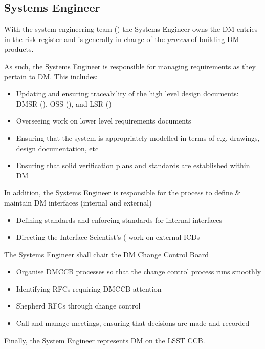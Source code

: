 \subsection{Systems Engineer \label{role:sysengineer}}

With the system engineering team () the Systems Engineer owns the DM entries in the risk register and is generally in charge of the \textit{process} of building DM products.

As such, the Systems Engineer is responsible for managing requirements as they pertain to DM.
This includes:

\begin{itemize}
\item Updating and ensuring traceability of the high level design documents: DMSR (), OSS (), and LSR ()
\item Overseeing work on lower level requirements documents
\item Ensuring that the system is appropriately modelled in terms of e.g. drawings, design documentation, etc
\item Ensuring that solid verification plans and standards are established within DM
\end{itemize}

In addition, the Systems Engineer is responsible for the process to define \& maintain DM interfaces (internal and external)

\begin{itemize}
\item Defining standards and enforcing standards for internal interfaces
\item Directing the Interface Scientist's ( work on external ICDs
\end{itemize}

The Systems Engineer shall chair the DM Change Control Board 

\begin{itemize}
\item Organise DMCCB processes so that the change control process runs smoothly
\item Identifying RFCs requiring DMCCB attention
\item Shepherd RFCs through change control
\item Call and manage meetings, ensuring that decisions are made and recorded
\end{itemize}

Finally, the System Engineer represents DM on the LSST CCB.

